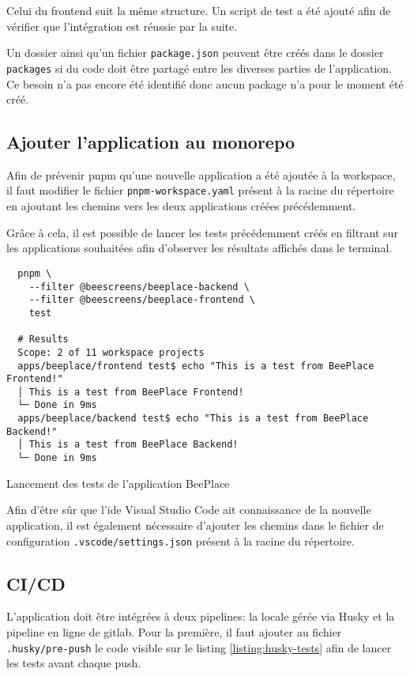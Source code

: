 Celui du frontend suit la même structure. Un script de test a été ajouté afin de vérifier que l'intégration est réussie par la suite.

Un dossier ainsi qu'un fichier \texttt{package.json} peuvent être créés dans le dossier \texttt{packages} si du code doit être partagé entre les diverses parties de l'application. Ce besoin n'a pas encore été identifié donc aucun package n'a pour le moment été créé.

\subsection{Ajouter l'application au monorepo}

Afin de prévenir \gls{pnpm} qu'une nouvelle application a été ajoutée à la workspace, il faut modifier le fichier \texttt{pnpm-workspace.yaml} présent à la racine du répertoire en ajoutant les chemins vers les deux applications créées précédemment.


Grâce à cela, il est possible de lancer les tests précédemment créés en filtrant sur les applications souhaitées afin d'observer les résultats affichés dans le terminal.

\begin{listing}[h]
  \begin{verbatim}
  pnpm \
    --filter @beescreens/beeplace-backend \
    --filter @beescreens/beeplace-frontend \
    test

  # Results
  Scope: 2 of 11 workspace projects
  apps/beeplace/frontend test$ echo "This is a test from BeePlace Frontend!"
  │ This is a test from BeePlace Frontend!
  └─ Done in 9ms
  apps/beeplace/backend test$ echo "This is a test from BeePlace Backend!"
  │ This is a test from BeePlace Backend!
  └─ Done in 9ms
\end{verbatim}
  \caption{Lancement des tests de l'application BeePlace}
  \label{listing:beeplace-tests}
\end{listing}

Afin d'être sûr que l'\gls{ide} Visual Studio Code ait connaissance de la nouvelle application, il est également nécessaire d'ajouter les chemins dans le fichier de configuration \texttt{.vscode/settings.json} présent à la racine du répertoire.

\subsection{CI/CD}

L'application doit être intégrées à deux pipelines: la locale gérée via Husky et la pipeline en ligne de \gls{gitlab}. Pour la première, il faut ajouter au fichier \texttt{.husky/pre-push} le code visible sur le listing \ref{listing:husky-tests} afin de lancer les tests avant chaque push.


